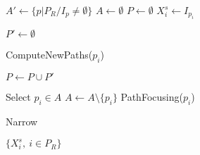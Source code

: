 \STATE $A' \gets \{p | P_R / I_p \neq \emptyset\}$ 
\STATE $A \gets \emptyset$
\STATE $P \gets \emptyset$ 
	\STATE $X_i^s \gets I_{p_i}$ \label{alg=X-init}
\ENDFOR 
{}

\STATE $P' \gets \emptyset$ 
	
\label{alg=start-add-paths}
\STATE ComputeNewPaths($p_i$) \label{alg=computeNewPaths}
\ENDFOR \label{alg=end-add-paths}

\STATE $P \gets P \cup P'$

\STATE {}
 \label{alg=start-ascending} 
	\STATE Select $p_i \in A$
	\STATE $A \gets A \setminus \{p_i\}$
	\STATE {}
	\STATE PathFocusing($p_i$) 
	
\ENDWHILE \label{alg=end-ascending}
\STATE Narrow \label{alg=narrowing}
\ENDWHILE

\STATE \RETURN $\{X_i^s,\ i \in P_R\}$

